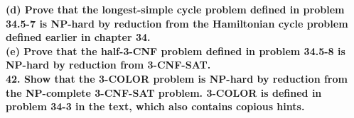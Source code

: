 \documentclass{article}
\begin{document}
\textbf{(d) Prove that the longest-simple cycle problem defined in problem 34.5-7 is NP-hard by reduction from the Hamiltonian cycle problem defined earlier in chapter 34.} \\ \newline
\textbf{(e) Prove that the half-3-CNF problem defined in problem 34.5-8 is NP-hard by reduction from 3-CNF-SAT.} \\ \newline
\textbf{42. Show that the 3-COLOR problem is NP-hard by reduction from the NP-complete 3-CNF-SAT problem. 3-COLOR is defined in problem 34-3 in the text, which also contains copious hints.}
\end{document}
